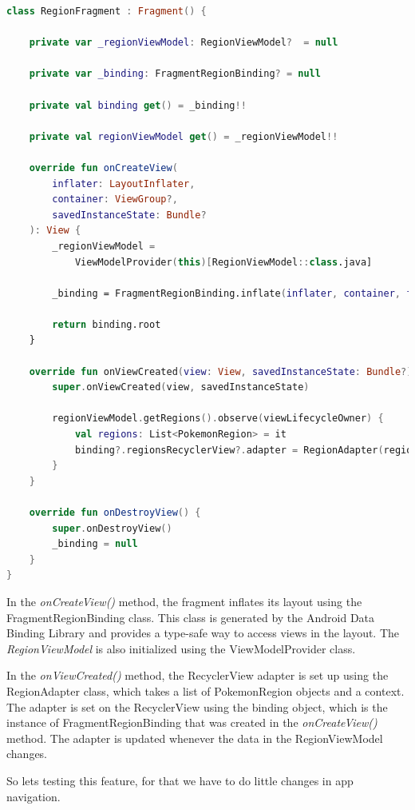 \documentclass[a4paper, 12pt]{article}
\begin{document}
\begin{lstlisting}[caption={View Models Gradle.}, label={code:fragment_region}, language=Kotlin]
	class RegionFragment : Fragment() {

    private var _regionViewModel: RegionViewModel?  = null

    private var _binding: FragmentRegionBinding? = null

    private val binding get() = _binding!!

    private val regionViewModel get() = _regionViewModel!!

    override fun onCreateView(
        inflater: LayoutInflater,
        container: ViewGroup?,
        savedInstanceState: Bundle?
    ): View {
        _regionViewModel =
            ViewModelProvider(this)[RegionViewModel::class.java]

        _binding = FragmentRegionBinding.inflate(inflater, container, false)

        return binding.root
    }

    override fun onViewCreated(view: View, savedInstanceState: Bundle?) {
        super.onViewCreated(view, savedInstanceState)

        regionViewModel.getRegions().observe(viewLifecycleOwner) {
            val regions: List<PokemonRegion> = it
            binding?.regionsRecyclerView?.adapter = RegionAdapter(regions, view.context)
        }
    }

    override fun onDestroyView() {
        super.onDestroyView()
        _binding = null
    }
}
\end{lstlisting}

In the \textit{onCreateView()} method, the fragment inflates its layout using the FragmentRegionBinding class.
 This class is generated by the Android Data Binding Library and provides a type-safe way to access views in the layout. 
 The \textit{RegionViewModel} is also initialized using the ViewModelProvider class.

In the \textit{onViewCreated()} method, the RecyclerView adapter is set up using the RegionAdapter class, which takes a list of PokemonRegion objects and a context.
The adapter is set on the RecyclerView using the binding object, which is the instance of 
FragmentRegionBinding that was created in the \textit{onCreateView()} method. The adapter is updated whenever the data in the RegionViewModel changes.

So lets testing this feature, for that we have to do little changes in app navigation.
\end{document}
